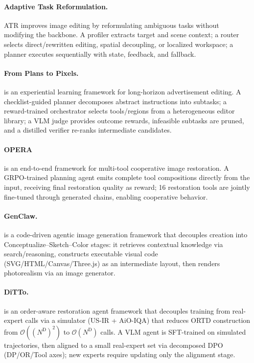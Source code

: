 \paragraph{Adaptive Task Reformulation.}
ATR improves image editing by reformulating ambiguous tasks without modifying the backbone. A profiler extracts target and scene context; a router selects direct/rewritten editing, spatial decoupling, or localized workspace; a planner executes sequentially with state, feedback, and fallback. ~\cite{avg260415917}

\paragraph{From Plans to Pixels.}
 is an experiential learning framework for long-horizon advertisement editing. A checklist-guided planner decomposes abstract instructions into subtasks; a reward-trained orchestrator selects tools/regions from a heterogeneous editor library; a VLM judge provides outcome rewards, infeasible subtasks are pruned, and a distilled verifier re-ranks intermediate candidates. ~\cite{avg260515181}

\paragraph{OPERA}
 is an end-to-end framework for multi-tool cooperative image restoration. A GRPO-trained planning agent emits complete tool compositions directly from the input, receiving final restoration quality as reward; 16 restoration tools are jointly fine-tuned through generated chains, enabling cooperative behavior. ~\cite{avg260522104}

\paragraph{GenClaw.}
 is a code-driven agentic image generation framework that decouples creation into Conceptualize–Sketch–Color stages: it retrieves contextual knowledge via search/reasoning, constructs executable visual code (SVG/HTML/Canvas/Three.js) as an intermediate layout, then renders photorealism via an image generator. ~\cite{ye2026genclaw}

\paragraph{DiTTo.}
 is an order-aware restoration agent framework that decouples training from real-expert calls via a simulator (US-IR + AiO-IQA) that reduces ORTD construction from $\mathcal{O}((N^{\mathrm{D}})^2)$ to $\mathcal{O}(N^{\mathrm{D}})$ calls. A VLM agent is SFT-trained on simulated trajectories, then aligned to a small real-expert set via decomposed DPO (DP/OR/Tool axes); new experts require updating only the alignment stage.~\cite{avg260530915}

